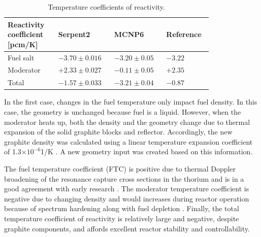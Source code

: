 \documentclass{anstrans}
\begin{document}
\captionsetup[table]{
  labelsep = newline,
  name = TABLE, 
  justification=justified,
  singlelinecheck=false,%
  labelsep=colon,%
  skip = \medskipamount}
\begin{table}[h!]
  \caption{Temperature coefficients of reactivity.}
\begin{tabular}{p{0.22\linewidth} p{0.22\linewidth} p{0.21\linewidth} p{0.15\linewidth}} \toprule
   Reactivity coefficient [pcm/K]  & Serpent2      & MCNP6 \cite{park_whole_2015}   & Reference \cite{robertson_conceptual_1971}      
\\ \midrule
Fuel salt        & $-3.70\pm0.016$ & $-3.20\pm0.05$ & $-3.22$ 
\\ \midrule
Moderator        & $+2.33\pm0.027$ & $-0.11\pm0.05$ & $+2.35$ 
\\ \midrule
Total            & $-1.57\pm0.033$ & $-3.21\pm0.04$ & $-0.87$ 
\\
\bottomrule
\end{tabular}
  \label{tab:tcoef}
\end{table}
In the first case, changes in the fuel temperature only impact fuel density. In 
this case, the geometry is unchanged because fuel is a liquid. However, when 
the moderator heats up, both the density and the geometry change due to thermal 
expansion of the solid graphite blocks and reflector. Accordingly, the new 
graphite density was calculated using a linear temperature expansion 
coefficient of 1.3$\times10^{-6}$1/K \cite{robertson_conceptual_1971}. A new 
geometry input was created based on this information.

The fuel temperature coefficient (FTC) is positive due to thermal Doppler broadening of the resonance capture cross sections in the thorium and is in a good agreement with early research \cite{robertson_conceptual_1971,park_whole_2015}. The moderator temperature coefficient is negative due to changing density and would increases during reactor operation because of spectrum hardening along with fuel depletion \cite{park_whole_2015}. Finally, the total temperature coefficient of reactivity is relatively large and negative, despite graphite components, and affords excellent reactor stability and controllability.
\end{document}
